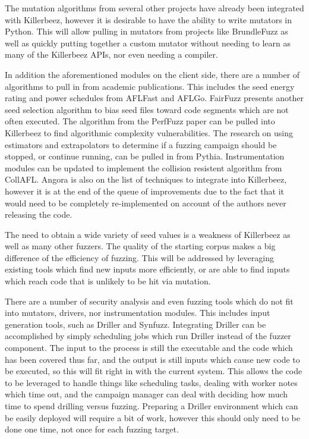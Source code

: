 The mutation algorithms from several other projects have already been
integrated with Killerbeez, however it is desirable to have the ability
to write mutators in Python.  This will allow pulling in mutators from
projects like BrundleFuzz\cite{brundlefuzz} as well as quickly putting
together a custom mutator without needing to learn as many of the Killerbeez
APIs, nor even needing a compiler.

In addition the aforementioned modules on the client side, there are a number
of algorithms to pull in from academic publications.  This includes the seed
energy rating and power schedules from AFLFast\cite{aflfast} and
AFLGo.\cite{aflgo} FairFuzz presents another seed selection algorithm to bias
seed files toward code segments which are not often executed.\cite{fairfuzz}
The algorithm from the PerfFuzz\cite{perffuzz} paper can be pulled into
Killerbeez to find algorithmic complexity vulnerabilities. The research on
using estimators and extrapolators to determine if a fuzzing campaign should
be stopped, or continue running, can be pulled in from Pythia.\cite{pythia}
Instrumentation modules can be updated to implement the collision resistent
algorithm from CollAFL.\cite{collafl} Angora is also on the list of techniques
to integrate into Killerbeez, however it is at the end of the queue of
improvements due to the fact that it would need to be completely re-implemented
on account of the authors never releasing the code.\cite{angora}

The need to obtain a wide variety of seed values is a weakness of Killerbeez
as well as many other fuzzers. The quality of the starting corpus makes a big
difference of the efficiency of fuzzing. This will be addressed by leveraging
existing tools which find new inputs more efficiently, or are able to find
inputs which reach code that is unlikely to be hit via mutation.

There are a number of security analysis and even fuzzing tools which do not
fit into mutators, drivers, nor instrumentation modules. This includes input
generation tools, such as Driller\cite{driller} and Synfuzz\cite{synfuzz}.
Integrating Driller can be accomplished by simply scheduling \BOINC{} jobs
which run Driller instead of the fuzzer component. The input to the process
is still the executable and the code which has been covered thus far, and the
output is still inputs which cause new code to be executed, so this will fit
right in with the current system.  This allows the \BOINC{} code to be
leveraged to handle things like scheduling tasks, dealing with worker notes
which time out, and the campaign manager can deal with deciding how much time
to spend drilling versus fuzzing. Preparing a Driller environment which can
be easily deployed will require a bit of work, however this should only need
to be done one time, not once for each fuzzing target.

